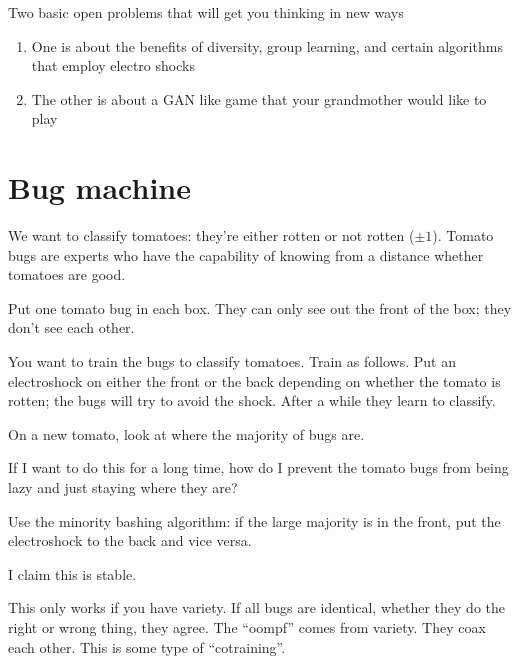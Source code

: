 \def\filepath{C:/Users/oldhe/Dropbox/Math/templates}






\pagestyle{fancy}
\chead{} 
\lfoot{} 
\cfoot{\thepage} 
\rfoot{} 
\renewcommand{\headrulewidth}{.3pt} 
\setlength\voffset{0in}
\setlength\textheight{648pt}





\tableofcontents

Two basic open problems that will get you thinking in new ways
\begin{enumerate}
\item
One is about the benefits of diversity, group learning, and certain algorithms that employ electro shocks
\item
The other is about a GAN like game that your grandmother would like to play
\end{enumerate}

\section{Bug machine}


We want to classify tomatoes: they're either rotten or not rotten ($\pm1$). 
Tomato bugs are experts who have the capability of knowing from a distance whether tomatoes are good.

Put one tomato bug in each box. They can only see out the front of the box; they don't see each other.

You want to train the bugs to classify tomatoes. Train as follows. Put an electroshock on either the front or the back depending on whether the tomato is rotten; the bugs will try to avoid the shock. After a while they learn to classify.

On a new tomato, look at where the majority of bugs are.

If I want to do this for a long time, how do I prevent the tomato bugs from being lazy and just staying where they are?

Use the minority bashing algorithm: if the large majority is in the front, put the electroshock to the back and vice versa.

I claim this is stable. 

This only works if you have variety. If all bugs are identical, whether they do the right or wrong thing, they agree. The ``oompf'' comes from variety. They coax each other. This is some type of ``cotraining''. 

